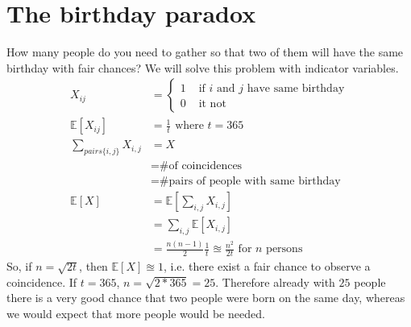 \section{The birthday paradox}
How many people do you need to gather so that two of them will have the same birthday with fair chances? We will solve this problem with indicator variables.
\begin{align*}
X_{ij} &=
  \left\{
      \begin{aligned}
      	1 &\text{ if $i$ and $j$ have same birthday} \\
        0 &\text{ it not }
      \end{aligned}
    \right.\\
\mathbb{E}[X_{ij}] &= \frac{1}{t} \text{ where $t = 365$}\\
\sum_{pairs \{i,j\}} X_{i,j} &= X\\
&= \text{\# of coincidences}\\
&= \text{\# pairs of people with same birthday}\\
\mathbb{E}[X] &=  \mathbb{E}[\sum_{i,j} X_{i,j}] \\
&= \sum_{i,j}  \mathbb{E}[X_{i,j}] \\
&= \frac{n(n-1)}{2} \frac{1}{t} \approxeq \frac{n^2}{2t} \text{ for $n$ persons}
\end{align*}
So, if $n = \sqrt{2t}$, then $\mathbb{E}[X] \approxeq 1$, i.e. there exist a fair chance to observe a coincidence. If $t = 365$, $n = \sqrt{2*365} = 25$. Therefore already with $25$ people there is a very good chance that two people were born on the same day, whereas we would expect that more people would be needed.